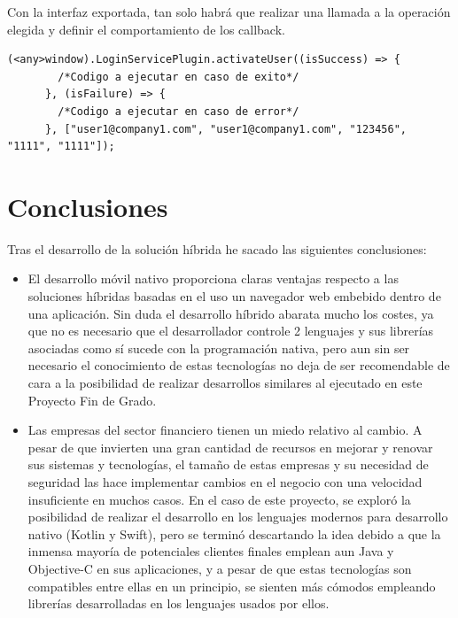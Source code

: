 \documentclass[a4paper, 12pt]{article}
\newenvironment{code}{\captionsetup{type=listing}}{}
\begin{document}
\bigbreak
Con la interfaz exportada, tan solo habrá que realizar una llamada a la operación elegida y definir el comportamiento de los callback.
\begin{code}
\label{code:motifconnector}
\begin{verbatim}
(<any>window).LoginServicePlugin.activateUser((isSuccess) => {
        /*Codigo a ejecutar en caso de exito*/
      }, (isFailure) => {
        /*Codigo a ejecutar en caso de error*/
      }, ["user1@company1.com", "user1@company1.com", "123456", "1111", "1111"]);
\end{verbatim}
\end{code}
\bigbreak
\section{Conclusiones}
\label{sec-5}
Tras el desarrollo de la solución híbrida he sacado las siguientes conclusiones:
\begin{itemize}
\item El desarrollo móvil nativo proporciona claras ventajas respecto a las soluciones híbridas basadas en el uso un navegador web embebido dentro de una aplicación. Sin duda el desarrollo híbrido abarata mucho los costes, ya que no es necesario que el desarrollador controle 2 lenguajes y sus librerías asociadas como sí sucede con la programación nativa, pero aun sin ser necesario el conocimiento de estas tecnologías no deja de ser recomendable de cara a la posibilidad de realizar desarrollos similares al ejecutado en este Proyecto Fin de Grado.
\item Las empresas del sector financiero tienen un miedo relativo al cambio. A pesar de que invierten una gran cantidad de recursos en mejorar y renovar sus sistemas y tecnologías, el tamaño de estas empresas y su necesidad de seguridad las hace implementar cambios en el negocio con una velocidad insuficiente en muchos casos. En el caso de este proyecto, se exploró la posibilidad de realizar el desarrollo en los lenguajes modernos para desarrollo nativo (Kotlin y Swift), pero se terminó descartando la idea debido a que la inmensa mayoría de potenciales clientes finales emplean aun Java y Objective-C en sus aplicaciones, y a pesar de que estas tecnologías son compatibles entre ellas en un principio, se sienten más cómodos empleando librerías desarrolladas en los lenguajes usados por ellos.
\end{itemize}
\printbibliography[heading=bibnumbered] %
\newpage
\end{document}
